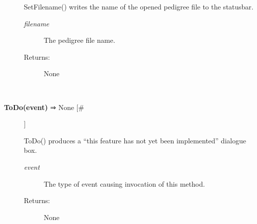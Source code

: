 \documentclass[10pt]{article}
\begin{document}
\begin{description}
 SetFilename() writes the name of the opened pedigree file to the statusbar.
\begin{description}
\item[\emph{filename}
] The pedigree file name.
\item[Returns:] None

\end{description}
\\ 

\item[\textbf{ToDo(event)}
 ⇒ None [\#]]

 ToDo() produces a ``this feature has not yet been implemented'' dialogue box.
\begin{description}
\item[\emph{event}
] The type of event causing invocation of this method.
\item[Returns:] None

\end{description}
\\ 


\end{description}
\end{document}

